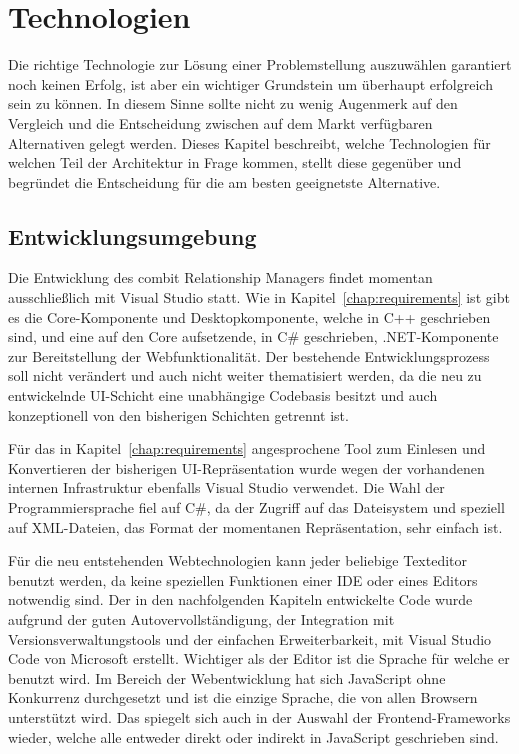 \chapter{Technologien}
\label{chap:technologies}

Die richtige Technologie zur Lösung einer Problemstellung auszuwählen garantiert noch keinen Erfolg, ist aber ein wichtiger Grundstein um überhaupt erfolgreich sein zu können. In diesem Sinne sollte nicht zu wenig Augenmerk auf den Vergleich und die Entscheidung zwischen auf dem Markt verfügbaren Alternativen gelegt werden. Dieses Kapitel beschreibt, welche Technologien für welchen Teil der Architektur in Frage kommen, stellt diese gegenüber und begründet die Entscheidung für die am besten geeignetste Alternative.

\section{Entwicklungsumgebung} 
Die Entwicklung des combit Relationship Managers findet momentan ausschließlich mit Visual Studio statt. Wie in Kapitel~\ref{chap:requirements} ist gibt es die Core-Komponente und Desktopkomponente, welche in C++ geschrieben sind, und eine auf den Core aufsetzende, in C\# geschrieben, .NET-Komponente zur Bereitstellung der Webfunktionalität. Der bestehende Entwicklungsprozess soll nicht verändert und auch nicht weiter thematisiert werden, da die neu zu entwickelnde UI-Schicht eine unabhängige Codebasis besitzt und auch konzeptionell von den bisherigen Schichten getrennt ist. 

Für das in Kapitel~\ref{chap:requirements} angesprochene Tool zum Einlesen und Konvertieren der bisherigen UI-Repräsentation wurde wegen der vorhandenen internen Infrastruktur ebenfalls Visual Studio verwendet. Die Wahl der Programmiersprache fiel auf C\#, da der Zugriff auf das Dateisystem und speziell auf XML-Dateien, das Format der momentanen Repräsentation, sehr einfach ist. 

Für die neu entstehenden Webtechnologien kann jeder beliebige Texteditor benutzt werden, da keine speziellen Funktionen einer IDE oder eines Editors notwendig sind. Der in den nachfolgenden Kapiteln entwickelte Code wurde aufgrund der guten Autovervollständigung, der Integration mit Versionsverwaltungstools und der einfachen Erweiterbarkeit, mit Visual Studio Code von Microsoft erstellt. Wichtiger als der Editor ist die Sprache für welche er benutzt wird. Im Bereich der Webentwicklung hat sich JavaScript ohne Konkurrenz durchgesetzt und ist die einzige Sprache, die von allen Browsern unterstützt wird. Das spiegelt sich auch in der Auswahl der Frontend-Frameworks wieder, welche alle entweder direkt oder indirekt in JavaScript geschrieben sind.   

